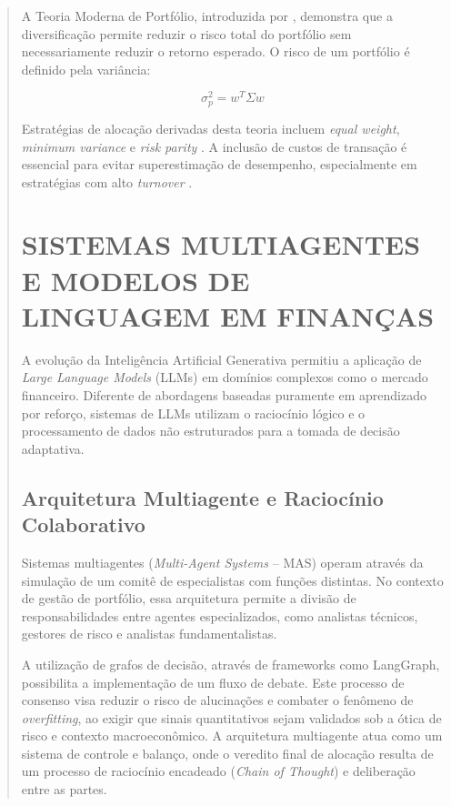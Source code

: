 \documentclass{eic-bcc-tcc}
\begin{document}
\begin{abstract}
A Teoria Moderna de Portfólio, introduzida por \citep{Markowitz1952}, demonstra que a diversificação permite reduzir o risco total do portfólio sem necessariamente reduzir o retorno esperado. O risco de um portfólio é definido pela variância:

\begin{equation}
\sigma_p^2 = w^T \Sigma w
\end{equation}

Estratégias de alocação derivadas desta teoria incluem \textit{equal weight}, \textit{minimum variance} \citep{Clarke2006} e \textit{risk parity} \citep{Qian2005}. A inclusão de custos de transação é essencial para evitar superestimação de desempenho, especialmente em estratégias com alto \textit{turnover} \citep{LopezDePrado2018}.

\section{SISTEMAS MULTIAGENTES E MODELOS DE LINGUAGEM EM FINANÇAS}

A evolução da Inteligência Artificial Generativa permitiu a aplicação de \textit{Large Language Models} (LLMs) em domínios complexos como o mercado financeiro. Diferente de abordagens baseadas puramente em aprendizado por reforço, sistemas de LLMs utilizam o raciocínio lógico e o processamento de dados não estruturados para a tomada de decisão adaptativa.

\subsection{Arquitetura Multiagente e Raciocínio Colaborativo}

Sistemas multiagentes (\textit{Multi-Agent Systems} -- MAS) operam através da simulação de um comitê de especialistas com funções distintas. No contexto de gestão de portfólio, essa arquitetura permite a divisão de responsabilidades entre agentes especializados, como analistas técnicos, gestores de risco e analistas fundamentalistas.

A utilização de grafos de decisão, através de frameworks como LangGraph, possibilita a implementação de um fluxo de debate. Este processo de consenso visa reduzir o risco de alucinações e combater o fenômeno de \textit{overfitting}, ao exigir que sinais quantitativos sejam validados sob a ótica de risco e contexto macroeconômico. A arquitetura multiagente atua como um sistema de controle e balanço, onde o veredito final de alocação resulta de um processo de raciocínio encadeado (\textit{Chain of Thought}) e deliberação entre as partes.


\end{abstract}
\end{document}
